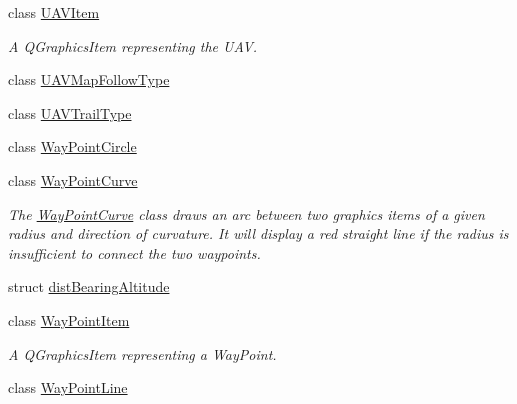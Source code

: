\begin{DoxyCompactItemize}
class \hyperlink{classmapcontrol_1_1_u_a_v_item}{\-U\-A\-V\-Item}
\begin{DoxyCompactList}\small\item\em \-A \-Q\-Graphics\-Item representing the \-U\-A\-V. \end{DoxyCompactList}\item 
class \hyperlink{classmapcontrol_1_1_u_a_v_map_follow_type}{\-U\-A\-V\-Map\-Follow\-Type}
\item 
class \hyperlink{classmapcontrol_1_1_u_a_v_trail_type}{\-U\-A\-V\-Trail\-Type}
\item 
class \hyperlink{classmapcontrol_1_1_way_point_circle}{\-Way\-Point\-Circle}
\item 
class \hyperlink{classmapcontrol_1_1_way_point_curve}{\-Way\-Point\-Curve}
\begin{DoxyCompactList}\small\item\em \-The \hyperlink{classmapcontrol_1_1_way_point_curve}{\-Way\-Point\-Curve} class draws an arc between two graphics items of a given radius and direction of curvature. \-It will display a red straight line if the radius is insufficient to connect the two waypoints. \end{DoxyCompactList}\item 
struct \hyperlink{structmapcontrol_1_1dist_bearing_altitude}{dist\-Bearing\-Altitude}
\item 
class \hyperlink{classmapcontrol_1_1_way_point_item}{\-Way\-Point\-Item}
\begin{DoxyCompactList}\small\item\em \-A \-Q\-Graphics\-Item representing a \-Way\-Point. \end{DoxyCompactList}\item 
class \hyperlink{classmapcontrol_1_1_way_point_line}{\-Way\-Point\-Line}
\end{DoxyCompactItemize}
